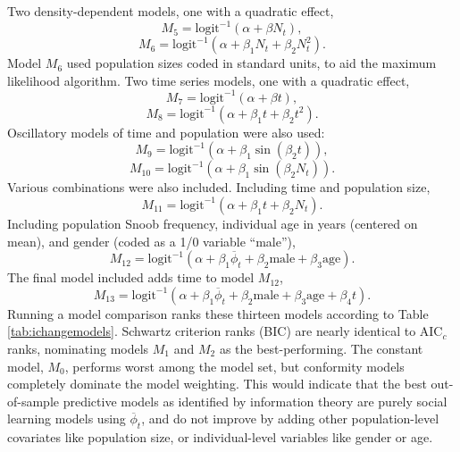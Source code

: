 Two density-dependent models, one with a quadratic effect,
	\[ M_5 = \mathrm{logit}^{-1}(\alpha + \beta N_t),\]
	\[ M_6 = \mathrm{logit}^{-1}(\alpha + \beta_1 N_t + \beta_2 N_t^2).\]
Model $M_6$ used population sizes coded in standard units, to aid the maximum likelihood algorithm. Two time series models, one with a quadratic effect,
	\[ M_7 = \mathrm{logit}^{-1}(\alpha + \beta t),\]
	\[ M_8 = \mathrm{logit}^{-1}(\alpha + \beta_1 t + \beta_2 t^2 ).\]
Oscillatory models of time and population were also used:
	\[ M_9 = \mathrm{logit}^{-1}(\alpha + \beta_1 \sin (\beta_2 t)),\]
	\[ M_{10} = \mathrm{logit}^{-1}(\alpha + \beta_1 \sin (\beta_2 N_t)).\]
Various combinations were also included.  Including time and population size,
\[ M_{11} = \mathrm{logit}^{-1}(\alpha + \beta_1 t + \beta_2 N_t).\]
Including population Snoob frequency, individual age in years (centered on mean), and gender (coded as a 1/0 variable ``male''),
\[ M_{12} = \mathrm{logit}^{-1}(\alpha + \beta_1 \overline{\phi}_t + \beta_2 \mathrm{male} + \beta_3 \mathrm{age}).\]
The final model included adds time to model $M_{12}$,
\[ M_{13} = \mathrm{logit}^{-1}(\alpha + \beta_1 \overline{\phi}_t + \beta_2 \mathrm{male} + \beta_3 \mathrm{age} + \beta_4 t).\]
Running a model comparison ranks these thirteen models according to Table \ref{tab:ichangemodels}.  Schwartz criterion ranks (BIC) are nearly identical to AIC$_c$ ranks, nominating models $M_1$ and $M_2$ as the best-performing.  The constant model, $M_0$, performs worst among the model set, but conformity models completely dominate the model weighting.  This would indicate that the best out-of-sample predictive models as identified by information theory are purely social learning models using $\overline{\phi}_t$, and do not improve by adding other population-level covariates like population size, or individual-level variables like gender or age.

